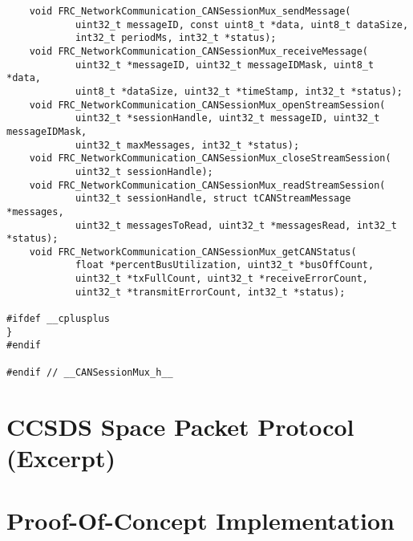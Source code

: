 \documentclass[12pt]{article}
\begin{document}
\begin{verbatim}
    void FRC_NetworkCommunication_CANSessionMux_sendMessage(
            uint32_t messageID, const uint8_t *data, uint8_t dataSize, 
            int32_t periodMs, int32_t *status);
    void FRC_NetworkCommunication_CANSessionMux_receiveMessage(
            uint32_t *messageID, uint32_t messageIDMask, uint8_t *data, 
            uint8_t *dataSize, uint32_t *timeStamp, int32_t *status);
    void FRC_NetworkCommunication_CANSessionMux_openStreamSession(
            uint32_t *sessionHandle, uint32_t messageID, uint32_t messageIDMask, 
            uint32_t maxMessages, int32_t *status);
    void FRC_NetworkCommunication_CANSessionMux_closeStreamSession(
            uint32_t sessionHandle);
    void FRC_NetworkCommunication_CANSessionMux_readStreamSession(
            uint32_t sessionHandle, struct tCANStreamMessage *messages, 
            uint32_t messagesToRead, uint32_t *messagesRead, int32_t *status);
    void FRC_NetworkCommunication_CANSessionMux_getCANStatus(
            float *percentBusUtilization, uint32_t *busOffCount, 
            uint32_t *txFullCount, uint32_t *receiveErrorCount, 
            uint32_t *transmitErrorCount, int32_t *status);

#ifdef __cplusplus
}
#endif

#endif // __CANSessionMux_h__
\end{verbatim}
\newpage
\section{CCSDS Space Packet Protocol (Excerpt)}
\label{app:ccsds}


\newpage 
\section{Proof-Of-Concept Implementation}
\end{document}
